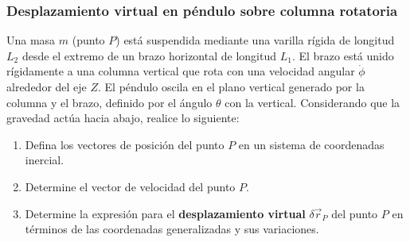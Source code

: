 \subsubsection{Desplazamiento virtual en péndulo sobre columna rotatoria}

Una masa $m$ (punto $P$) está suspendida mediante una varilla rígida de longitud $L_2$ desde el extremo de un brazo horizontal de longitud $L_1$. El brazo está unido rígidamente a una columna vertical que rota con una velocidad angular $\dot{\phi}$ alrededor del eje $Z$. El péndulo oscila en el plano vertical generado por la columna y el brazo, definido por el ángulo $\theta$ con la vertical. Considerando que la gravedad actúa hacia abajo, realice lo siguiente:

\begin{enumerate}
    \item Defina los vectores de posición del punto $P$ en un sistema de coordenadas inercial.
    \item Determine el vector de velocidad del punto $P$.
    \item Determine la expresión para el \textbf{desplazamiento virtual} $\delta \vec{r}_P$ del punto $P$ en términos de las coordenadas generalizadas y sus variaciones.
\end{enumerate}

